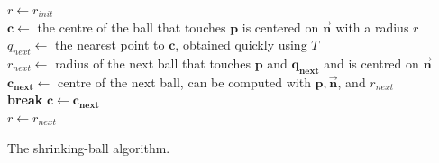 \begin{algorithm}[tb]
	\DontPrintSemicolon{}
	$r \leftarrow r_{init}$ \\
	$\mathbf{c} \leftarrow$ the centre of the ball that touches $\mathbf{p}$ is centered on $\vec{\mathbf{n}}$ with a radius $r$ \\
	 {
		$q_{next} \leftarrow$ the nearest point to $\mathbf{c}$, obtained quickly using $T$ \\
		$r_{next} \leftarrow$ radius of the next ball that touches $\mathbf{p}$ and $\mathbf{q_{next}}$ and is centred on $\vec{\mathbf{n}}$ \\
		$\mathbf{c_{next}} \leftarrow$ centre of the next ball, can be computed with $\mathbf{p}, \vec{\mathbf{n}}$, and $r_{next}$ \\
		 {
			\textbf{break}
		}
		$\mathbf{c} \leftarrow \mathbf{c_{next}}$ \\
		$r \leftarrow r_{next}$
	}
	\caption{The shrinking-ball algorithm.}
	\label{alg:shrinkBall}
\end{algorithm}


